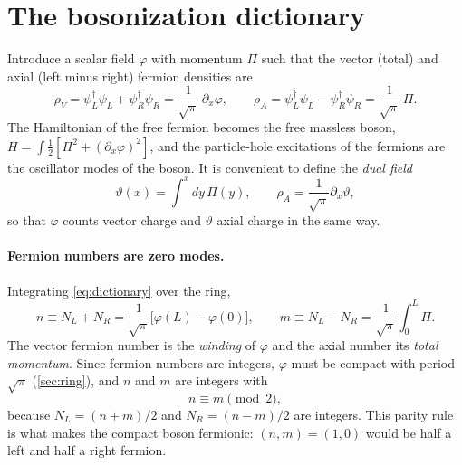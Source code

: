 \section{The bosonization dictionary}
Introduce a scalar field $\varphi$ with momentum $\Pi$ such that the vector (total) and axial (left minus right)
fermion densities are
\begin{equation}\label{eq:dictionary}
  \rho_V = \psi_L^\dagger\psi_L + \psi_R^\dagger\psi_R = \frac{1}{\sqrt\pi}\,\partial_x\varphi,\qquad
  \rho_A = \psi_L^\dagger\psi_L - \psi_R^\dagger\psi_R = \frac{1}{\sqrt\pi}\,\Pi .
\end{equation}
The Hamiltonian of the free fermion becomes the free massless boson,
$H = \int\frac12[\Pi^2 + (\partial_x\varphi)^2]$, and the particle-hole excitations of the fermions are the
oscillator modes of the boson. It is convenient to define the \emph{dual field}
\begin{equation}
  \vartheta(x) = \int^x dy\,\Pi(y), \qquad \rho_A = \frac{1}{\sqrt\pi}\partial_x\vartheta ,
\end{equation}
so that $\varphi$ counts vector charge and $\vartheta$ axial charge in the same way.

\paragraph{Fermion numbers are zero modes.} Integrating \eqref{eq:dictionary} over the ring,
\begin{equation}
  n \equiv N_L + N_R = \frac{1}{\sqrt\pi}\bigl[\varphi(L) - \varphi(0)\bigr],\qquad
  m \equiv N_L - N_R = \frac{1}{\sqrt\pi}\int_0^L \Pi .
\end{equation}
The vector fermion number is the \emph{winding} of $\varphi$ and the axial number its \emph{total momentum}.
Since fermion numbers are integers, $\varphi$ must be compact with period $\sqrt\pi$ (\cref{sec:ring}), and $n$
and $m$ are integers with
\begin{equation}\label{eq:parity}
  n \equiv m \pmod 2,
\end{equation}
because $N_L = (n+m)/2$ and $N_R = (n-m)/2$ are integers. This parity rule is what makes the compact boson
fermionic: $(n,m) = (1,0)$ would be half a left and half a right fermion.

